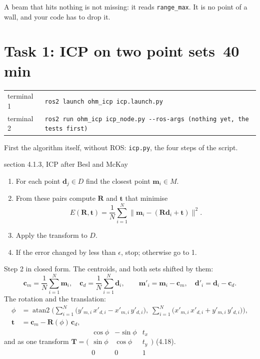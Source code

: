 \documentclass[11pt,a4paper,parskip=half]{scrartcl}
\makeatletter
\newcommand{\thema}[1]{\texttt{#1}}
\newcommand{\datei}[1]{\texttt{#1}}
\newcommand{\minutes}[1]{\hfill{\normalsize\mdseries\color{ohmgrey}\faClock[regular]~#1 min}}
\newcommand{\matsym}[1]{\mathbf{#1}}
\renewcommand{\vec}[1]{\mathbf{#1}}
\newcommand{\running}[2]{\begin{tcolorbox}[base, colback=black!3, borderline west={2.5pt}{0pt}{ohmgrey},
        title={\faTerminal~Running}, coltitle=ohmgrey, colbacktitle=black!3, fonttitle=\small\bfseries,
        toptitle=2pt, bottomtitle=0pt, fontupper=\small]
  \begin{tabularx}{\linewidth}{@{}>{\color{ohmgrey}}l >{\raggedright\arraybackslash}X@{}}
    terminal 1 & \texttt{ros2 launch ohm\_icp icp.launch.py#1} \\
    terminal 2 & \texttt{ros2 run ohm\_icp icp\_node.py -\kern0pt-ros-args #2}
  \end{tabularx}
\end{tcolorbox}}
\makeatother
\begin{document}
\begin{checkpoint}
A beam that hits nothing is not missing: it reads \thema{range\_max}. It is no point of a wall, and your code
has to drop it.
\end{checkpoint}

\newpage
\section{Task 1: ICP on two point sets\minutes{40}}
\label{sec:task1}
\running{}{(nothing yet, the tests first)}

First the algorithm itself, without ROS: \datei{icp.py}, the four steps of the script.

\begin{script}{section 4.1.3, ICP after Besl and McKay}
\begin{enumerate}[label=\arabic*.]
  \item For each point \(\vec d_j \in D\) find the closest point \(\vec m_i \in M\).
  \item From these pairs compute \(\matsym R\) and \(\vec t\) that minimise
        \begin{equation}
          E(\matsym R, \vec t) = \frac{1}{N} \sum_{i=1}^{N} \|\vec m_i - (\matsym R \vec d_i + \vec t)\|^2 .
          \tag{4.4}
        \end{equation}
  \item Apply the transform to \(D\).
  \item If the error changed by less than \(\epsilon\), stop; otherwise go to 1.
\end{enumerate}
Step 2 in closed form. The centroids, and both sets shifted by them:
\begin{equation}
  \vec c_m = \frac1N \sum_{i=1}^{N} \vec m_i, \quad \vec c_d = \frac1N \sum_{i=1}^{N} \vec d_i, \qquad
  \vec m'_i = \vec m_i - \vec c_m, \quad \vec d'_i = \vec d_i - \vec c_d .
  \tag{4.5--4.8}
\end{equation}
The rotation and the translation:
\begin{align}
  \phi &= \operatorname{atan2}\Big( \sum_{i=1}^{N} \big(y'_{m,i}\, x'_{d,i} - x'_{m,i}\, y'_{d,i}\big),\;
                                    \sum_{i=1}^{N} \big(x'_{m,i}\, x'_{d,i} + y'_{m,i}\, y'_{d,i}\big) \Big) ,
  \tag{4.14}\\
  \vec t &= \vec c_m - \matsym R(\phi)\, \vec c_d ,
  \tag{4.17}
\end{align}
and as one transform
\(\matsym T = \big(\begin{smallmatrix} \cos\phi & -\sin\phi & t_x\\ \sin\phi & \cos\phi & t_y\\ 0&0&1
\end{smallmatrix}\big)\) (4.18).
\end{script}
\end{document}
